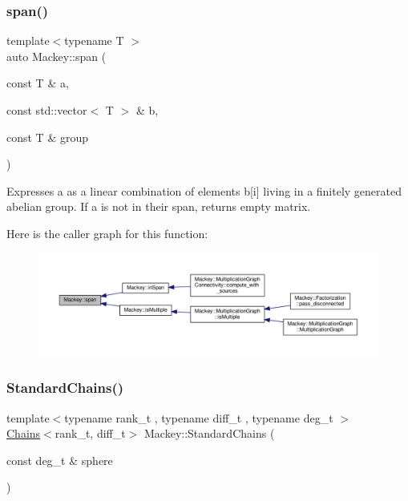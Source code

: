 \subsubsection{\texorpdfstring{span()}{span()}}
{\footnotesize\ttfamily template$<$typename T $>$ \\
auto Mackey\+::span (\begin{DoxyParamCaption}\item[{const T \&}]{a,  }\item[{const std\+::vector$<$ T $>$ \&}]{b,  }\item[{const T \&}]{group }\end{DoxyParamCaption})}



Expresses a as a linear combination of elements b\mbox{[}i\mbox{]} living in a finitely generated abelian group. If a is not in their span, returns empty matrix. 

Here is the caller graph for this function\+:\nopagebreak
\begin{figure}[H]
\begin{center}
\leavevmode
\includegraphics[width=350pt]{namespaceMackey_a1b3e66989e89c8b97d113d8eec0b47b8_icgraph}
\end{center}
\end{figure}
\mbox{\label{namespaceMackey_a425b988266cedec0299fb539d99179b1}} 
\subsubsection{\texorpdfstring{Standard\+Chains()}{StandardChains()}\hspace{0.1cm}{\footnotesize\ttfamily [1/2]}}
{\footnotesize\ttfamily template$<$typename rank\+\_\+t , typename diff\+\_\+t , typename deg\+\_\+t $>$ \\
\hyperlink{classMackey_1_1Chains}{Chains}$<$rank\+\_\+t, diff\+\_\+t$>$ Mackey\+::\+Standard\+Chains (\begin{DoxyParamCaption}\item[{const deg\+\_\+t \&}]{sphere }\end{DoxyParamCaption})}



